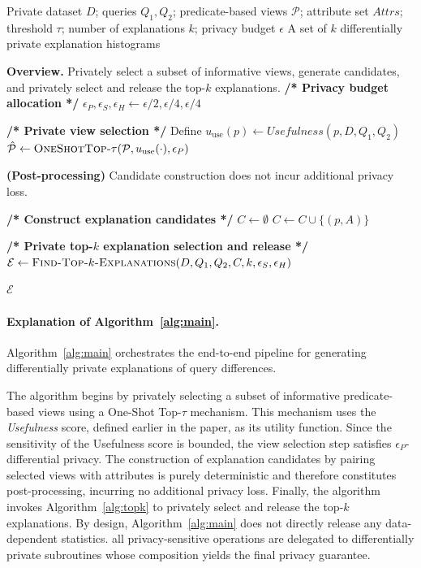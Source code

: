 \begin{algorithm}[t]
\caption{Private-Queries-Diff-Top-$k$-Explanation}
\label{alg:main}
\begin{algorithmic}[1]
\Require Private dataset $D$; queries $Q_1, Q_2$; predicate-based views $\mathcal{P}$; attribute set $\textit{Attrs}$; threshold $\tau$; number of explanations $k$; privacy budget $\epsilon$
\Ensure A set of $k$ differentially private explanation histograms

\Statex \textbf{Overview.} Privately select a subset of informative views, generate candidates, and privately select and release the top-$k$ explanations.
\State \textbf{/* Privacy budget allocation */}
\State $\epsilon_P, \epsilon_S, \epsilon_H  \gets \epsilon/2, \epsilon/4, \epsilon/4$


\State \textbf{/* Private view selection */}
\State Define $u_{\text{use}}(p) \gets \textit{Usefulness}(p, D, Q_1, Q_2)$
\State $\hat{\mathcal{P}}  \gets \textsc{OneShotTop-}\tau(\mathcal{P}, u_{\text{use}}(\cdot), \epsilon_P)$

\Statex \textbf{(Post-processing)} Candidate construction does not incur additional privacy loss.

\State \textbf{/* Construct explanation candidates */}
\State $C \gets \emptyset$
        \State $C \gets C \cup \{(p, A)\}$
    \EndFor
\EndFor

\State \textbf{/* Private top-$k$ explanation selection and release */}
\State $\mathcal{E} \gets \textsc{Find-Top-$k$-Explanations}(D, Q_1, Q_2, C, k, \epsilon_S, \epsilon_H)$

\Return $\mathcal{E}$
\end{algorithmic}
\end{algorithm}

\paragraph{Explanation of Algorithm~\ref{alg:main}.}
Algorithm~\ref{alg:main} orchestrates the end-to-end pipeline for generating differentially private explanations of query differences.

The algorithm begins by privately selecting a subset of informative predicate-based views using a One-Shot Top-$\tau$ mechanism. This mechanism uses the \emph{Usefulness} score, defined earlier in the paper, as its utility function. Since the sensitivity of the Usefulness score is bounded, the view selection step satisfies $\epsilon_P$-differential privacy. The construction of explanation candidates by pairing selected views with attributes is purely deterministic and therefore constitutes post-processing, incurring no additional privacy loss. Finally, the algorithm invokes Algorithm~\ref{alg:topk} to privately select and release the top-$k$ explanations. By design, Algorithm~\ref{alg:main} does not directly release any data-dependent statistics. all privacy-sensitive operations are delegated to differentially private subroutines whose composition yields the final privacy guarantee.


